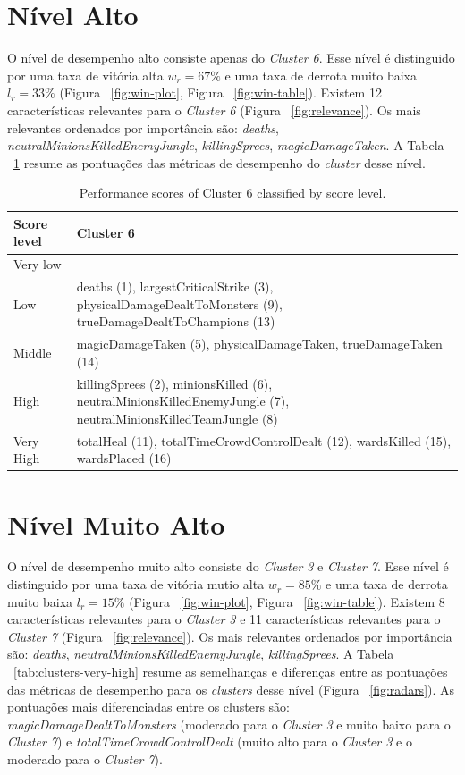 \section{Nível Alto}
O nível de desempenho alto consiste apenas do \textit{Cluster 6}. Esse nível é distinguido por uma taxa de vitória alta $w_r = 67 \%$ e uma taxa de derrota muito baixa $l_r = 33 \%$ (Figura ~\ref{fig:win-plot}, Figura ~\ref{fig:win-table}). Existem 12 características relevantes para o \textit{Cluster 6} (Figura ~\ref{fig:relevance}). Os mais relevantes ordenados por importância são: \textit{deaths}, \textit{neutralMinionsKilledEnemyJungle}, \textit{killingSprees}, \textit{magicDamageTaken}. A Tabela ~\ref{tab:clusters-high} resume as pontuações das métricas de desempenho do \textit{cluster} desse nível.

\begin{table}
  \tiny
  \caption{Performance scores of Cluster 6 classified by score level.}
  \label{tab:clusters-high}
  \begin{tabular}{p{}p{}}
    \toprule
    Score level & Cluster 6 \\
    \midrule
Very low &  \\
    \hline
Low & deaths (1), largestCriticalStrike (3), physicalDamageDealtToMonsters (9), trueDamageDealtToChampions (13) \\
    \hline
Middle & magicDamageTaken (5), physicalDamageTaken, trueDamageTaken (14)  \\
    \hline
High & killingSprees (2), minionsKilled (6), neutralMinionsKilledEnemyJungle (7), neutralMinionsKilledTeamJungle (8) \\
    \hline
Very High & totalHeal (11), totalTimeCrowdControlDealt (12), wardsKilled (15), wardsPlaced (16) \\ 
  \bottomrule
\end{tabular}
\end{table}

\section{Nível Muito Alto}
O nível de desempenho muito alto consiste do \textit{Cluster 3} e \textit{Cluster 7}. Esse nível é distinguido por uma taxa de vitória mutio alta $w_r = 85\% $ e uma taxa de derrota muito baixa $l_r = 15\% $ (Figura ~\ref{fig:win-plot}, Figura ~\ref{fig:win-table}). Existem 8 características relevantes para o \textit{Cluster 3} e 11 características relevantes para o \textit{Cluster 7} (Figura ~\ref{fig:relevance}). Os mais relevantes ordenados por importância são: \textit{deaths}, \textit{neutralMinionsKilledEnemyJungle}, \textit{killingSprees}. A Tabela ~\ref{tab:clusters-very-high} resume as semelhanças e diferenças entre as pontuações das métricas de desempenho para os \textit{clusters} desse nível (Figura ~\ref{fig:radars}). As pontuações mais diferenciadas entre os clusters são: \textit{magicDamageDealtToMonsters} (moderado para o \textit{Cluster 3} e muito baixo para o \textit{Cluster 7}) e \textit{totalTimeCrowdControlDealt} (muito alto para o \textit{Cluster 3} e o moderado para o \textit{Cluster 7}).

